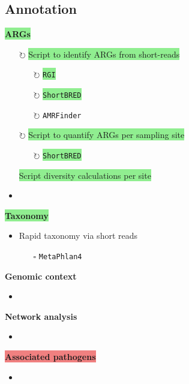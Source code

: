 \documentclass[11pt]{report}
\newcommand{\done}{\checkmark}  %
\newcommand{\pending}{$\square$}  %
\newcommand{\refine}{$\circlearrowright$}  %
\newcommand{\highlightessential}[1]{\colorbox{lightgreen}{#1}}  %
\newcommand{\highlightoptional}[1]{\colorbox{lightorange}{#1}}  %
\newcommand{\highlightrobust}[1]{\colorbox{lightcoral}{#1}}  %
\begin{document}
\begin{multicols}{2}
\section*{Annotation}
\par\noindent\hspace{1cm}\highlightessential{\textbf{\large ARGs}}  %
	\begin{itemize}
		\item [\refine]\highlightessential{Script to identify ARGs from short-reads}
			\begin{itemize}
				\item [\refine] \highlightessential{\texttt{RGI}}
				\item [\refine] \highlightessential{\texttt{ShortBRED}}
				\item [\refine] \highlightoptional{\texttt{AMRFinder}}
			\end{itemize}
		\item [\refine] \highlightessential{Script to quantify ARGs per sampling site}
			\begin{itemize}
				\item [\refine] \highlightessential{\texttt{ShortBRED}}
			\end{itemize}
		\item [\done] \highlightessential{Script diversity calculations per site}
		\item 
	\end{itemize}
\par\noindent\hspace{1cm}\highlightessential{\textbf{\large Taxonomy}}  %
	\begin{itemize}
		\item Rapid taxonomy via short reads
			\begin{itemize}
				\item [\pending] \highlightoptional{\texttt{MetaPhlan4}}
				
			\end{itemize}
	\end{itemize}
\par\noindent\hspace{1cm}\highlightoptional{\textbf{\large Genomic context}}  %
	\begin{itemize}
		\item 
	\end{itemize}
\par\noindent\hspace{1cm}\highlightoptional{\textbf{\large Network analysis}}  %
	\begin{itemize}
		\item 
	\end{itemize}
\par\noindent\hspace{1cm}\highlightrobust{\textbf{\large Associated pathogens}}  %
	\begin{itemize}
		\item 
	\end{itemize}
	

\end{multicols}
\end{document}
